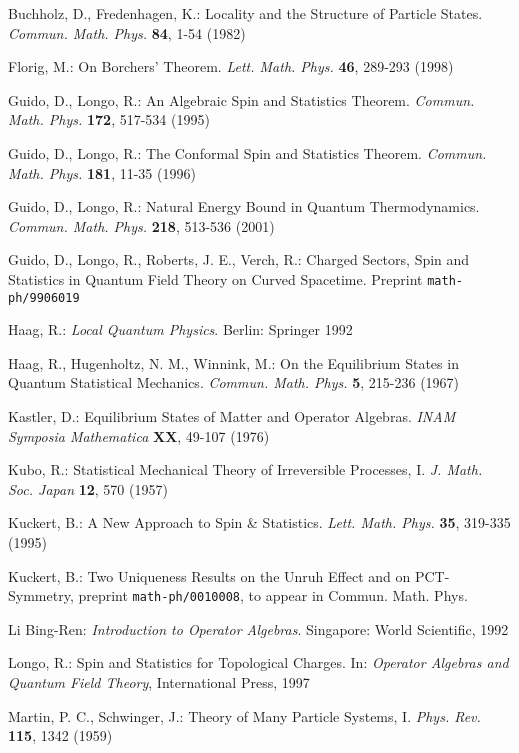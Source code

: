 \documentclass[a4paper,11pt]{article}
\begin{document}
\begin{thebibliography}{*****}
 Buchholz, D., Fredenhagen, K.: Locality and the Structure of
Particle States. {\it Commun. Math. Phys.} {\bf 84}, 1-54 (1982)



 Florig, M.: On Borchers' Theorem. {\it Lett. Math. Phys.}
{\bf 46}, 289-293 (1998)

 Guido, D., Longo, R.: An Algebraic Spin and Statistics Theorem.
{\it Commun. Math. Phys.} {\bf 172}, 517-534 (1995)

 Guido, D., Longo, R.: The Conformal Spin and Statistics Theorem.
{\it Commun. Math. Phys.} {\bf 181}, 11-35 (1996)

 Guido, D., Longo, R.: Natural Energy Bound in Quantum
Thermodynamics. {\it Commun. Math. Phys.} {\bf 218}, 513-536 (2001)

 Guido, D., Longo, R., Roberts, J. E., Verch, R.: Charged
Sectors, Spin and Statistics in Quantum Field Theory on Curved
Spacetime. Preprint {\tt math-ph/9906019}

 Haag, R.: {\it Local Quantum Physics}. Berlin: Springer 1992

 Haag, R., Hugenholtz, N. M., Winnink, M.: On the Equilibrium
States in Quantum Statistical Mechanics. {\it Commun. Math. Phys.} {\bf 5},
215-236 (1967)


 Kastler, D.: Equilibrium States of Matter and Operator
Algebras. {\it INAM Symposia Mathematica} {\bf XX}, 49-107 (1976)

 Kubo, R.: Statistical Mechanical Theory of Irreversible
Processes, I. {\it J. Math. Soc. Japan} {\bf 12}, 570 (1957)

 Kuckert, B.: A New Approach to Spin \& Statistics.
{\it Lett. Math. Phys.} {\bf 35}, 319-335 (1995)

 Kuckert, B.: Two Uniqueness Results on the Unruh Effect and on
PCT-Symmetry, preprint {\tt math-ph/0010008}, to appear in Commun. Math. Phys.

 Li Bing-Ren: {\it Introduction to Operator Algebras}.
Singapore: World Scientific, 1992


 Longo, R.: Spin and Statistics for Topological Charges.
In: {\it Operator Algebras and Quantum Field Theory}, International Press, 1997

 Martin, P. C., Schwinger, J.: Theory of
Many Particle Systems, I. {\it Phys. Rev.} {\bf 115}, 1342 (1959)



\end{thebibliography}
\end{document}
